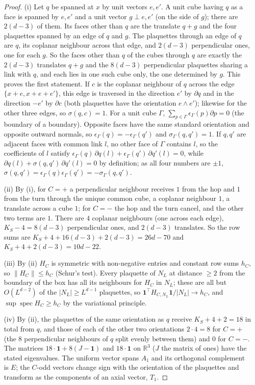 \documentclass[11pt,a4paper]{article}
\theoremstyle{definition}
\theoremstyle{remark}
\DeclareMathOperator{\spec}{spec}
\newcommand{\R}{\mathbb{R}}
\newcommand{\norm}[1]{\lVert #1\rVert}
\begin{document}
\begin{proof}
(i) Let $q$ be spanned at $x$ by unit vectors $e,e'$. A unit cube having $q$ as a face is spanned by $e,e'$ and a unit vector $g\perp e,e'$ (on the side of
$g$); there are $2(d-3)$ of them. Its faces other than $q$ are the translate $q+g$ and the four plaquettes spanned by an edge of $q$ and $g$. The
plaquettes through an edge of $q$ are $q$, its coplanar neighbour across that edge, and $2(d-3)$ perpendicular ones, one for each $g$. So the faces other
than $q$ of the cubes through $q$ are exactly the $2(d-3)$ translates $q+g$ and the $8(d-3)$ perpendicular plaquettes sharing a link with $q$, and each
lies in one such cube only, the one determined by $g$. This proves the first statement. If $c$ is the coplanar neighbour of $q$ across the edge
$\{x+e,x+e+e'\}$, this edge is traversed in the direction $e'$ by $\partial q$ and in the direction $-e'$ by $\partial c$ (both plaquettes have the
orientation $e\wedge e'$); likewise for the other three edges, so $\sigma(q,c)=1$. For a unit cube $\Gamma$, $\sum_{p\in\Gamma}\epsilon_\Gamma(p)\partial p=0$
(the boundary of a boundary). Opposite faces have the same standard orientation and opposite outward normals, so $\epsilon_\Gamma(q)=-\epsilon_\Gamma(q')$ and
$\sigma_\Gamma(q,q')=1$. If $q,q'$ are adjacent faces with common link $l$, no other face of $\Gamma$ contains $l$, so the coefficients of $l$ satisfy
$\epsilon_\Gamma(q)\,\partial q(l)+\epsilon_\Gamma(q')\,\partial q'(l)=0$, while $\partial q(l)+\sigma(q,q')\,\partial q'(l)=0$ by definition; as all four numbers are
$\pm1$, $\sigma(q,q')=\epsilon_\Gamma(q)\epsilon_\Gamma(q')=-\sigma_\Gamma(q,q')$.

(ii) By (i), for $C=+$ a perpendicular neighbour receives $1$ from the hop and $1$ from the turn through the unique common cube, a coplanar neighbour $1$,
a translate across a cube $1$; for $C=-$ the hop and the turn cancel, and the other two terms are $1$. There are $4$ coplanar neighbours (one across each
edge), $K_S-4=8(d-3)$ perpendicular ones, and $2(d-3)$ translates. So the row sums are $K_S+4+16(d-3)+2(d-3)=26d-70$ and $K_S+4+2(d-3)=10d-22$.

(iii) By (ii) $H_C$ is symmetric with non-negative entries and constant row sums $h_C$, so $\norm{H_C}\le h_C$ (Schur's test). Every plaquette of $N_L$ at
distance $\ge2$ from the boundary of the box has all its neighbours for $H_C$ in $N_L$; these are all but $O(L^{d-2})$ of the $|N_L|\ge L^{d-1}$
plaquettes, so $\mathbf 1^\top H_{C,N_L}\mathbf 1/|N_L|\to h_C$, and $\sup\spec H_C\ge h_C$ by the variational principle.

(iv) By (ii), the plaquettes of the same orientation as $q$ receive $K_S+4+2=18$ in total from $q$, and those of each of the other two orientations $2\cdot4=8$
for $C=+$ (the $8$ perpendicular neighbours of $q$ split evenly between them) and $0$ for $C=-$. The matrices $18\cdot\mathbf 1+8(J-\mathbf 1)$ and
$18\cdot\mathbf 1$ on $\R^3$ ($J$ the matrix of ones) have the stated eigenvalues. The uniform vector spans $A_1$ and its orthogonal complement is $E$; the
$C$-odd vectors change sign with the orientation of the plaquettes and transform as the components of an axial vector, $T_1$.
\end{proof}
\end{document}
